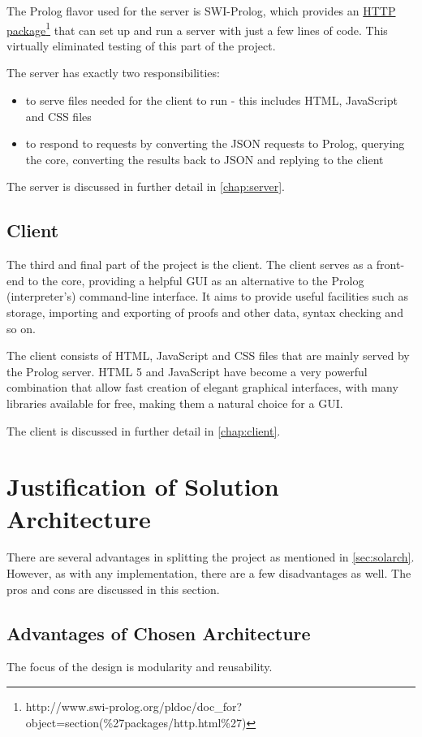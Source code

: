\documentclass[11pt,twoside,a4paper]{report}
\begin{document}
The Prolog flavor used for the server is SWI-Prolog, which provides an \href{http://www.swi-prolog.org/pldoc/doc_for?object=section(\%27packages/http.html\%27)}{HTTP package}\footnote{http://www.swi-prolog.org/pldoc/doc\_for?object=section(\%27packages/http.html\%27)} that can set up and run a server with just a few lines of code. This virtually eliminated testing of this part of the project.

The server has exactly two responsibilities:

\begin{itemize}
\item
to serve files needed for the client to run - this includes HTML, JavaScript and CSS files
\item
to respond to requests by converting the JSON requests to Prolog, querying the core, converting the results back to JSON and replying to the client
\end{itemize}

The server is discussed in further detail in \autoref{chap:server}.

\subsection{Client}
The third and final part of the project is the client. The client serves as a front-end to the core, providing a helpful GUI as an alternative to the Prolog (interpreter's) command-line interface. It aims to provide useful facilities such as storage, importing and exporting of proofs and other data, syntax checking and so on.

The client consists of HTML, JavaScript and CSS files that are mainly served by the Prolog server. HTML 5 and JavaScript have become a very powerful combination that allow fast creation of elegant graphical interfaces, with many libraries available for free, making them a natural choice for a GUI.

The client is discussed in further detail in \autoref{chap:client}.

\section{Justification of Solution Architecture}
There are several advantages in splitting the project as mentioned in \autoref{sec:solarch}. However, as with any implementation, there are a few disadvantages as well. The pros and cons are discussed in this section.

\subsection{Advantages of Chosen Architecture}
The focus of the design is modularity and reusability. 
\end{document}
